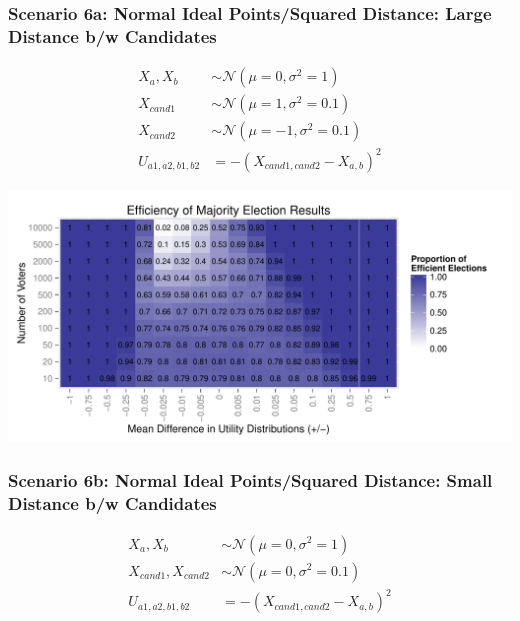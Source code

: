 \documentclass[12pt]{article}\usepackage[]{graphicx}\usepackage[]{color}
\makeatletter
\def\maxwidth{ %
  \ifdim\Gin@nat@width>\linewidth
    \linewidth
  \else
    \Gin@nat@width
  \fi
}
\newenvironment{knitrout}{}{} %
\makeatother
\begin{document}
\clearpage
\subsubsection*{Scenario 6a: Normal Ideal Points/Squared Distance: Large Distance b/w Candidates}
\begin{align*}
X_a,X_b &\sim \mathcal{N}(\mu=0,\sigma^2=1) \\
X_{cand1} &\sim \mathcal{N}(\mu=1,\sigma^2=0.1) \\
X_{cand2} &\sim \mathcal{N}(\mu=-1,\sigma^2=0.1) \\
U_{a1,a2,b1,b2} &= -(X_{cand1,cand2}-X_{a,b})^2
\end{align*}

\begin{knitrout}
\color{fgcolor}
\includegraphics[width=\maxwidth]{figure/unnamed-chunk-11} 

\end{knitrout}


\clearpage
\subsubsection*{Scenario 6b: Normal Ideal Points/Squared Distance: Small Distance b/w Candidates}
\begin{align*}
X_a,X_b &\sim \mathcal{N}(\mu=0,\sigma^2=1) \\
X_{cand1},X_{cand2} &\sim \mathcal{N}(\mu=0,\sigma^2=0.1) \\
U_{a1,a2,b1,b2} &= -(X_{cand1,cand2}-X_{a,b})^2
\end{align*}
\end{document}
